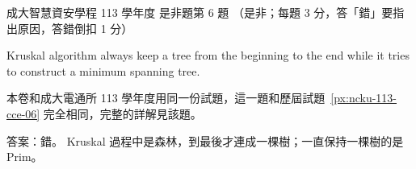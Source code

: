 \begin{pastexam}[label={px:ncku-113-isec-06}]{成大智慧資安學程 113 學年度 是非題第 6 題}
（是非；每題 3 分，答「錯」要指出原因，答錯倒扣 1 分）

Kruskal algorithm always keep a tree from the beginning to the end while it tries to construct a
minimum spanning tree.
\end{pastexam}

\begin{pastsoln}
本卷和成大電通所 113 學年度用同一份試題，這一題和歷屆試題~\ref{px:ncku-113-cce-06} 完全相同，完整的詳解見該題。

答案：錯。 Kruskal 過程中是森林，到最後才連成一棵樹；一直保持一棵樹的是 Prim。
\end{pastsoln}
